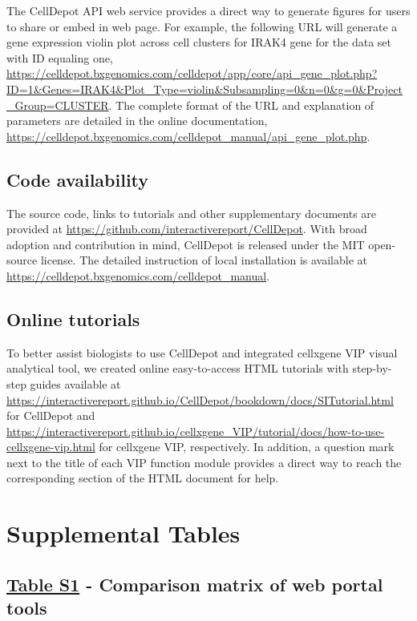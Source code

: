 \documentclass[
  openany]{book}
\begin{document}
The CellDepot API web service provides a direct way to generate figures for users to share or embed in web page. For example, the following URL will generate a gene expression violin plot across cell clusters for IRAK4 gene for the data set with ID equaling one, \url{https://celldepot.bxgenomics.com/celldepot/app/core/api_gene_plot.php?ID=1\&Genes=IRAK4\&Plot_Type=violin\&Subsampling=0\&n=0\&g=0\&Project_Group=CLUSTER}. The complete format of the URL and explanation of parameters are detailed in the online documentation, \url{https://celldepot.bxgenomics.com/celldepot_manual/api_gene_plot.php}.

\hypertarget{code-availability}{%
\section{Code availability}\label{code-availability}}

The source code, links to tutorials and other supplementary documents are provided at \url{https://github.com/interactivereport/CellDepot}. With broad adoption and contribution in mind, CellDepot is released under the MIT open-source license. The detailed instruction of local installation is available at \url{https://celldepot.bxgenomics.com/celldepot_manual}.

\hypertarget{online-tutorials}{%
\section{Online tutorials}\label{online-tutorials}}

To better assist biologists to use CellDepot and integrated cellxgene VIP visual analytical tool, we created online easy-to-access HTML tutorials with step-by-step guides available at \url{https://interactivereport.github.io/CellDepot/bookdown/docs/SITutorial.html} for CellDepot and \url{https://interactivereport.github.io/cellxgene_VIP/tutorial/docs/how-to-use-cellxgene-vip.html} for cellxgene VIP, respectively. In addition, a question mark next to the title of each VIP function module provides a direct way to reach the corresponding section of the HTML document for help.

\hypertarget{SITable}{%
\chapter{Supplemental Tables}\label{SITable}}

\hypertarget{table-s1---comparison-matrix-of-web-portal-tools}{%
\section*{\texorpdfstring{\href{https://github.com/interactivereport/CellDepot/blob/gh-pages/bookdown/S1.csv}{Table S1} - Comparison matrix of web portal tools}{Table S1 - Comparison matrix of web portal tools}}\label{table-s1---comparison-matrix-of-web-portal-tools}}
\end{document}
